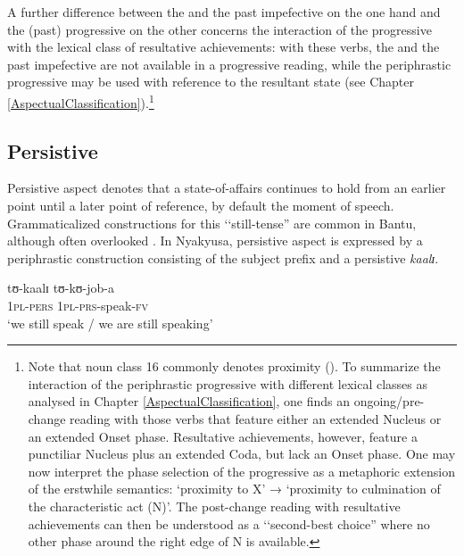 A further difference between the  and the past impefective on the one hand and the (past) progressive on the other concerns the interaction of the progressive with the lexical class of resultative achievements: with these verbs, the  and the past impefective are not available in a progressive reading, while the periphrastic progressive may be used with reference to the resultant state (see Chapter \ref{AspectualClassification}).\footnote{Note that  noun class 16 commonly denotes proximity (). To summarize the interaction of the periphrastic progressive with different lexical classes as analysed in Chapter \ref{AspectualClassification}, one finds an ongoing/pre-change reading with those verbs that feature either an extended Nucleus or an extended Onset phase. Resultative achievements, however, feature a punctiliar Nucleus plus an extended Coda, but lack an Onset phase. One may now interpret the phase selection of the progressive as a metaphoric extension of the erstwhile  semantics: \lq proximity to X' → \lq proximity to culmination of the characteristic act (N)'. The post-change reading with resultative achievements can then be understood as a \lq\lq second-best choice'' where no other phase around the right edge of N is available.}
\subsection{Persistive}\label{Persistive}
Persistive aspect denotes that a state-of-affairs continues to hold from an earlier point until a later point of reference, by default the moment of speech. Grammaticalized constructions for this \lq\lq still-tense'' are common in Bantu, although often overlooked \citep[45]{NurseD2008}.
In Nyakyusa, persistive aspect is expressed by a periphrastic construction consisting of the subject prefix and a persistive  \textit{kaalɪ}.

\begin{exe}
\ex \label{exPersistiveIntroductory}\gll tʊ-kaalɪ tʊ-kʊ-job-a\\
\textsc{1pl}-\textsc{pers} \textsc{1pl}-\textsc{prs}-speak-\textsc{fv}\\
\glt `we still speak / we are still speaking'
\end{exe}

